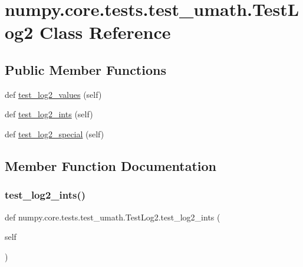 \hypertarget{classnumpy_1_1core_1_1tests_1_1test__umath_1_1TestLog2}{}\section{numpy.\+core.\+tests.\+test\+\_\+umath.\+Test\+Log2 Class Reference}
\label{classnumpy_1_1core_1_1tests_1_1test__umath_1_1TestLog2}
\subsection*{Public Member Functions}
\begin{DoxyCompactItemize}
\item 
def \hyperlink{classnumpy_1_1core_1_1tests_1_1test__umath_1_1TestLog2_a5b0627d3ca5c23eaf59b7cc2aef368c5}{test\+\_\+log2\+\_\+values} (self)
\item 
def \hyperlink{classnumpy_1_1core_1_1tests_1_1test__umath_1_1TestLog2_ada16081336d37f16d07a086876d3a9a9}{test\+\_\+log2\+\_\+ints} (self)
\item 
def \hyperlink{classnumpy_1_1core_1_1tests_1_1test__umath_1_1TestLog2_a163c29bef6b817df9c7e7e183aebfabc}{test\+\_\+log2\+\_\+special} (self)
\end{DoxyCompactItemize}


\subsection{Member Function Documentation}
\mbox{\label{classnumpy_1_1core_1_1tests_1_1test__umath_1_1TestLog2_ada16081336d37f16d07a086876d3a9a9}} 
\subsubsection{\texorpdfstring{test\+\_\+log2\+\_\+ints()}{test\_log2\_ints()}}
{\footnotesize\ttfamily def numpy.\+core.\+tests.\+test\+\_\+umath.\+Test\+Log2.\+test\+\_\+log2\+\_\+ints (\begin{DoxyParamCaption}\item[{}]{self }\end{DoxyParamCaption})}

